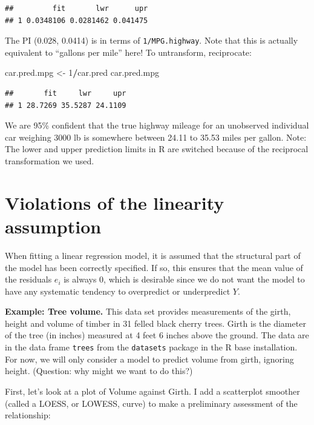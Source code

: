 \documentclass[
]{book}
\newenvironment{Shaded}{\begin{snugshade}}{\end{snugshade}}
\newcommand{\DecValTok}[1]{\textcolor[rgb]{0.00,0.00,0.81}{#1}}
\newcommand{\NormalTok}[1]{#1}
\newcommand{\OtherTok}[1]{\textcolor[rgb]{0.56,0.35,0.01}{#1}}
\newcommand{\SpecialCharTok}[1]{\textcolor[rgb]{0.81,0.36,0.00}{\textbf{#1}}}
\begin{document}
\begin{verbatim}
##         fit       lwr      upr
## 1 0.0348106 0.0281462 0.041475
\end{verbatim}

The PI (0.028, 0.0414) is in terms of \texttt{1/MPG.highway}. Note that this is actually equivalent to ``gallons per mile'' here! To untransform, reciprocate:

\begin{Shaded}
\begin{Highlighting}[]
\NormalTok{car.pred.mpg }\OtherTok{\textless{}{-}} \DecValTok{1}\SpecialCharTok{/}\NormalTok{car.pred}
\NormalTok{car.pred.mpg}
\end{Highlighting}
\end{Shaded}

\begin{verbatim}
##       fit     lwr     upr
## 1 28.7269 35.5287 24.1109
\end{verbatim}

We are 95\% confident that the true highway mileage for an unobserved individual car weighing 3000 lb is somewhere between 24.11 to 35.53 miles per gallon. Note: The lower and upper prediction limits in R are switched because of the reciprocal transformation we used.

\hypertarget{violations-of-the-linearity-assumption}{%
\section{Violations of the linearity assumption}\label{violations-of-the-linearity-assumption}}

When fitting a linear regression model, it is assumed that the structural part of the model has been correctly specified. If so, this ensures that the mean value of the residuals \(e_i\) is always 0, which is desirable since we do not want the model to have any systematic tendency to overpredict or underpredict \(Y\).

\textbf{Example: Tree volume.} This data set provides measurements of the girth, height and volume of timber in 31 felled black cherry trees. Girth is the diameter of the tree (in inches) measured at 4 feet 6 inches above the ground. The data are in the data frame \texttt{trees} from the \texttt{datasets} package in the R base installation. For now, we will only consider a model to predict volume from girth, ignoring height. (Question: why might we want to do this?)

First, let's look at a plot of Volume against Girth. I add a scatterplot smoother (called a LOESS, or LOWESS, curve) to make a preliminary assessment of the relationship:
\end{document}
